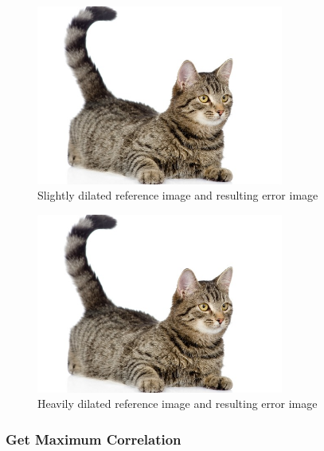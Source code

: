 \documentclass[10pt,twocolumn,letterpaper]{article}
\begin{document}
\begin{figure}[!ht]
\includegraphics[width = 3.2in]{img/cat.jpg}
\caption{Slightly dilated reference image and resulting error image}
\label{fig:detSW1}
\end{figure}
\par

\begin{figure}[!ht]
\includegraphics[width = 3.2in]{img/cat.jpg}
\caption{Heavily dilated reference image and resulting error image}
\label{fig:detSW2}
\end{figure}

\subsubsection*{Get Maximum Correlation}
\end{document}
